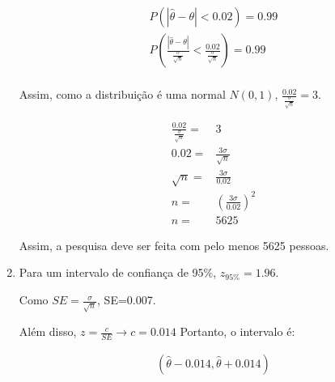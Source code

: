 \documentclass[11pt,a4paper]{book}
\begin{document}
\begin{enumerate}
		\begin{eqnarray*}
			P(|\hat{\theta}-\theta|<0.02)=0.99\\
			P\left(\frac{|\hat{\theta}-\theta|}{\frac{\sigma}{\sqrt{n}}} < \frac{0.02}{\frac{\sigma}{\sqrt{n}}}\right)=0.99\\
		\end{eqnarray*}
		
		Assim, como a distribuição é uma normal $N(0,1)$, $\frac{0.02}{\frac{\sigma}{\sqrt{n}}}=3$.
		
		\begin{eqnarray*}
			\frac{0.02}{\frac{\sigma}{\sqrt{n}}}=&3\\
			0.02=&\frac{3\sigma}{\sqrt{n}}\\
			\sqrt{n}=&\frac{3\sigma}{0.02}\\
			n=&\left(\frac{3\sigma}{0.02}\right)^2\\
			n=&5625
		\end{eqnarray*}

		Assim, a pesquisa deve ser feita com pelo menos 5625 pessoas.
		
		\item
		
		Para um intervalo de confiança de 95\%, $z_{95\%}=1.96$.
		
		Como $SE=\frac{\sigma}{\sqrt{n}}$, SE=0.007.
		
		Além disso, $z=\frac{c}{SE}\rightarrow c=0.014$
		Portanto, o intervalo é:
		
		\begin{eqnarray*}
			(\hat{\theta}-0.014,\hat{\theta}+0.014)
		\end{eqnarray*}
		
	\end{enumerate}
\end{document}
